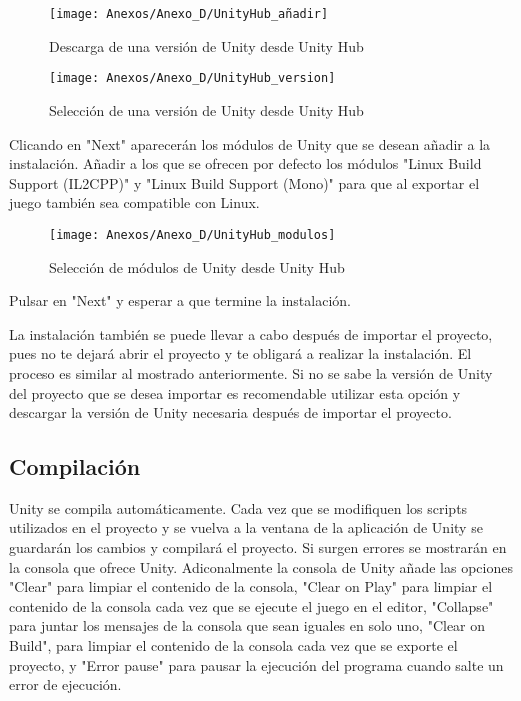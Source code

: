 \begin{figure}[h]
\centering
\texttt{[image: Anexos/Anexo\_D/UnityHub\_añadir]}
\caption{Descarga de una versión de Unity desde Unity Hub}
\end{figure}

\clearpage
\begin{figure}[h]
\centering
\texttt{[image: Anexos/Anexo\_D/UnityHub\_version]}
\caption{Selección de una versión de Unity desde Unity Hub}
\end{figure}

Clicando en "Next" aparecerán los módulos de Unity que se desean añadir a la instalación. Añadir a los que se ofrecen por defecto los módulos "Linux Build Support (IL2CPP)" y "Linux Build Support (Mono)"
para que al exportar el juego también sea compatible con Linux.

\begin{figure}[h]
\centering
\texttt{[image: Anexos/Anexo\_D/UnityHub\_modulos]}
\caption{Selección de módulos de Unity desde Unity Hub}
\end{figure}

Pulsar en "Next" y esperar a que termine la instalación.

La instalación también se puede llevar a cabo después de importar el proyecto, pues no te dejará abrir el proyecto y te obligará a realizar la instalación. El proceso es similar al mostrado anteriormente. Si no se sabe la versión de Unity del proyecto que se desea importar es recomendable utilizar esta opción y descargar la versión de Unity necesaria después de importar el proyecto.

\subsection{Compilación}
Unity se compila automáticamente. Cada vez que se modifiquen los scripts utilizados en el proyecto y se vuelva a la ventana de la aplicación de Unity se guardarán los cambios y compilará el proyecto. Si surgen errores se mostrarán en la consola que ofrece Unity.
 Adiconalmente la consola de Unity añade las opciones "Clear" para limpiar el contenido de la consola, "Clear on Play" para limpiar el contenido de la consola cada vez que se ejecute el juego en el editor, "Collapse" para juntar los mensajes de la consola que sean iguales en solo uno, "Clear on Build", para limpiar el contenido de la consola cada vez que se exporte el proyecto, y "Error pause" para pausar la ejecución del programa cuando salte un error de ejecución.

